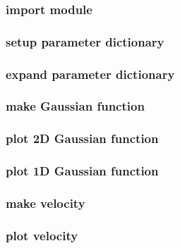 

\begin{frame} \frametitle{import module}
\end{frame}
\cwpnote{}

\begin{frame} \frametitle{setup parameter dictionary}
\end{frame}
\cwpnote{}

\begin{frame} \frametitle{expand parameter dictionary}
\end{frame}
\cwpnote{}


\begin{frame} \frametitle{make Gaussian function}
\end{frame}
\cwpnote{}

\begin{frame} \frametitle{plot 2D Gaussian function}
\end{frame}
\cwpnote{}

\begin{frame}
\end{frame}
\cwpnote{}

\begin{frame} \frametitle{plot 1D Gaussian function}
\end{frame}
\cwpnote{}

\begin{frame}
\end{frame}
\cwpnote{}


\begin{frame} \frametitle{make velocity}
\end{frame}
\cwpnote{}

\begin{frame} \frametitle{plot velocity}
\end{frame}
\cwpnote{}

\begin{frame}
\end{frame}
\cwpnote{}

